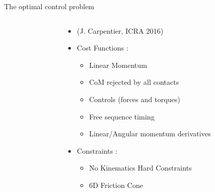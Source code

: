 \begin{frame}{The optimal control problem}
\begin{columns}
\begin{column}{0.5\textwidth}

\end{column}
%
{\color{txtcolor2}\vrule}
%
%
\begin{column}{0.5\textwidth}

\begin{itemize}
\item {(J. Carpentier, ICRA 2016)}
\end{itemize}

\begin{itemize}
  \item Cost Functions :
  \begin{itemize}
    \item {Linear Momentum}
    \item \textcolor{blue!70!black}{CoM rejected by all contacts}
    \item {Controls (forces and torques)}
    \item \textcolor{blue!70!black}{Free sequence timing}
    \item {Linear/Angular momentum derivatives}
  \end{itemize}
  \item Constraints :
  \begin{itemize}
    \item \textcolor{blue!70!black}{No Kinematics Hard Constraints}
    \item \textcolor{blue!70!black}{6D Friction Cone}
  \end{itemize}
\end{itemize}


\end{column}
\end{columns}
\end{frame}
